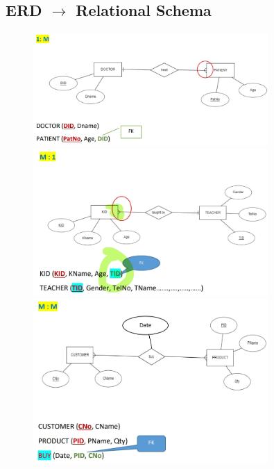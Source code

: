 \documentclass[a4paper, 12pt]{article}
\begin{document}
    \subsection{ERD $\rightarrow$ Relational Schema}
       \begin{figure}[H]
        \includegraphics[width=0.8\textwidth]{chapter2c_9.png}
        \includegraphics[width=0.8\textwidth]{chapter2c_10.png}
        \includegraphics[width=0.8\textwidth]{chapter2c_11.png}
       \end{figure}
\end{document}
